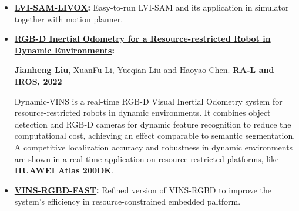 \documentclass[11pt,a4paper,sans]{moderncv}        %
\begin{document}
{\begin{itemize}
\textbf{Jianheng Liu}, Dongyu Yan and Haoyao Chen. \textbf{Submitted to ICRA, 2023}

We manage to transplant active reconstruction methods into
implicit representation, which has advantages over
traditional explicit representation in resolution, model
size, and continuity.
Our proposed information gain metric is based on spatial
point sampling rather than voxel traversing, which can be
seamlessly integrated into the implicit model.
An implicit reconstruction method for bounded objects
considering free space is also proposed to use information
fully.

\item \textbf{\href{https://github.com/jianhengLiu/LVI-SAM-LIVOX}{LVI-SAM-LIVOX}:} Easy-to-run LVI-SAM and its application in simulator together with motion planner.

\item \textbf{\href{https://github.com/HITSZ-NRSL/Dynamic-VINS.git}{RGB-D Inertial Odometry for a Resource-restricted Robot in Dynamic Environments}:} 

\textbf{Jianheng Liu}, XuanFu Li, Yueqian Liu and Haoyao Chen. \textbf{RA-L and IROS, 2022}

Dynamic-VINS is a real-time RGB-D Visual Inertial Odometry system for resource-restricted robots in dynamic environments. It combines object detection and RGB-D cameras for dynamic feature recognition to reduce the computational cost, achieving an effect comparable to semantic segmentation. A competitive localization accuracy and robustness in dynamic environments are shown in a real-time application on resource-restricted platforms, like \textbf{HUAWEI Atlas 200DK}.


\item \textbf{\href{https://github.com/jianhengLiu/VINS-RGBD-FAST}{VINS-RGBD-FAST}:} Refined version of VINS-RGBD to improve the system's efficiency in resource-constrained embedded paltform.



\end{itemize}}
\end{document}
